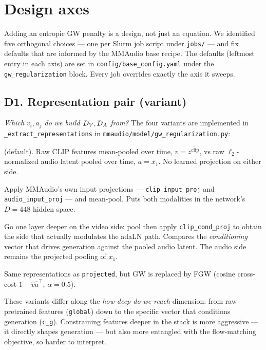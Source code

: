 \section{Design axes}
\label{sec:design}

Adding an entropic GW penalty is a design, not just an equation.
We identified five orthogonal choices --- one per Slurm job script
under \texttt{jobs/} --- and fix defaults that are informed by the
MMAudio base recipe. The defaults (leftmost entry in each axis) are
set in \texttt{config/base\_config.yaml} under the
\texttt{gw\_regularization} block. Every job overrides exactly the
axis it sweeps.

\subsection*{D1. Representation pair (variant)}
\emph{Which $v_i, a_j$ do we build $D_{V}, D_{A}$ from?}
The four variants are implemented in
\texttt{\_extract\_representations} in
\texttt{mmaudio/model/gw\_regularization.py}:
\begin{description}[leftmargin=2em]
  \item[\texttt{global}] (default). Raw CLIP features
    mean-pooled over time, $v = \overline{z^{\text{clip}}}$, vs
    raw $\ell_2$-normalized audio latent pooled over time,
    $a = \overline{x_1}$. No learned projection on either side.
  \item[\texttt{projected}] Apply MMAudio's own input projections
    --- \texttt{clip\_input\_proj} and \texttt{audio\_input\_proj} ---
    and mean-pool. Puts both modalities in the network's
    $D{=}448$ hidden space.
  \item[\texttt{c\_g}] Go one layer deeper on the video side: pool
    then apply \texttt{clip\_cond\_proj} to obtain the side that
    actually modulates the adaLN path. Compares the
    \emph{conditioning} vector that drives generation against the
    pooled audio latent. The audio side remains the projected
    pooling of $x_1$.
  \item[\texttt{fused}] Same representations as
    \texttt{projected}, but GW is replaced by FGW (cosine
    cross-cost $1 - \hat v \hat a^{\top}$, $\alpha=0.5$).
\end{description}

These variants differ along the \emph{how-deep-do-we-reach}
dimension: from raw pretrained features (\texttt{global}) down to
the specific vector that conditions generation (\texttt{c\_g}).
Constraining features deeper in the stack is more aggressive --- it
directly shapes generation --- but also more entangled with the
flow-matching objective, so harder to interpret.

